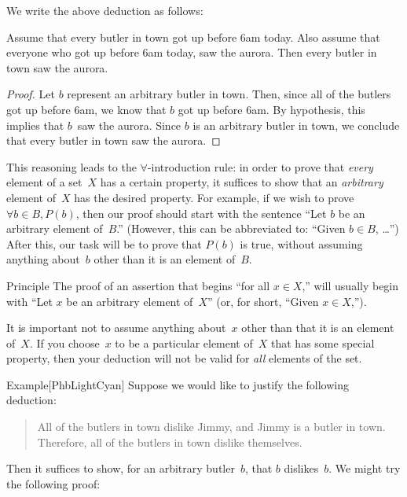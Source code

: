 \documentclass[../MATH-2000-Notes.tex]{subfiles}
\begin{document}
We write the above deduction as follows:
\begin{Theorem}
    {}
    Assume that every butler in town got up before 6am today. Also assume that everyone who got up before 6am today, saw the aurora. Then every butler in town  saw the aurora.
\end{Theorem}
\begin{proof}
    Let $b$ represent an arbitrary butler in town. Then, since all of the butlers got up before 6am, we know that $b$ got up before 6am. By hypothesis, this implies that $b$~saw the aurora.  Since $b$ is an arbitrary butler in town, we conclude that every butler in town saw the aurora.
\end{proof}
This reasoning leads to the $\forall$-introduction rule: in order to prove that \emph{every} element of a set~$X$ has a certain property,  it suffices to show that an \emph{arbitrary} element of~$X$ has the desired property. For example, if we wish to prove $\forall b \in B, P(b)$, then our proof should start with the sentence ``Let $b$ be an arbitrary element of~$B$\rlap.'' (However, this can be abbreviated to: ``Given $b \in B$, \ldots'') After this, our task will be to prove that $P(b)$ is true, without assuming anything about~$b$ other than it is an element of~$B$.  
\begin{paperbox}{Principle}
    The proof of an assertion that begins ``for all $x \in X$\rlap,'' will usually begin with ``Let $x$ be an arbitrary element of~$X$'' (or, for short, ``Given $x \in X$\rlap,'').
\end{paperbox}
\begin{Note}
    It is important not to assume anything about~$x$ other than that it is an element of~$X$. If you choose~$x$ to be a particular element of~$X$ that has some special property, then your deduction will not be valid for \emph{all} elements of the set.
\end{Note}
\begin{commentbox}{Example}[{PhbLightCyan}]
    Suppose we would like to justify the following deduction:
    \begin{quote}
        All of the butlers in town dislike Jimmy, and Jimmy is a butler in town. Therefore, all of the butlers in town dislike  themselves.
    \end{quote}
Then it suffices to show, for an arbitrary butler~$b$, that $b$ dislikes~$b$. We might try the following proof:
\end{commentbox}
\end{document}
